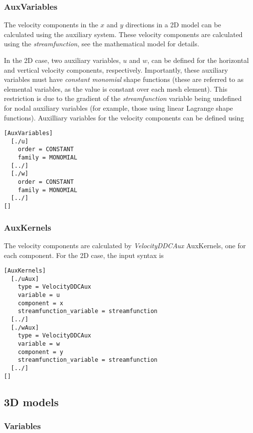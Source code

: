 \documentclass[11pt, a4paper]{csiroreport2012}
\begin{document}
\subsubsection*{AuxVariables}

The velocity components in the $x$ and $y$ directions in a 2D model can be calculated using the auxiliary system. These velocity components are calculated using the \emph{streamfunction}, see the mathematical model for details.

In the 2D case, two auxiliary variables, $u$ and $w$, can be defined for the horizontal and vertical velocity components, respectively. Importantly, these auxiliary variables must have \emph{constant monomial} shape functions (these are referred to as elemental variables, as the value is constant over each mesh element). This restriction is due to the gradient of the \emph{streamfunction} variable being undefined for nodal auxiliary variables (for example, those using linear Lagrange shape functions). Auxilliary variables for the velocity components can be defined using
\begin{verbatim}
[AuxVariables]
  [./u]
    order = CONSTANT
    family = MONOMIAL
  [../]
  [./w]
    order = CONSTANT
    family = MONOMIAL
  [../]
[]
\end{verbatim}

\subsubsection*{AuxKernels}

The velocity components are calculated by \emph{VelocityDDCAux} AuxKernels, one for each component. For the 2D case, the input syntax is
\begin{verbatim}
[AuxKernels]
  [./uAux]
    type = VelocityDDCAux
    variable = u
    component = x
    streamfunction_variable = streamfunction
  [../]
  [./wAux]
    type = VelocityDDCAux
    variable = w
    component = y
    streamfunction_variable = streamfunction
  [../]
[]
\end{verbatim}

\subsection{3D models}

\subsubsection*{Variables}
\end{document}
